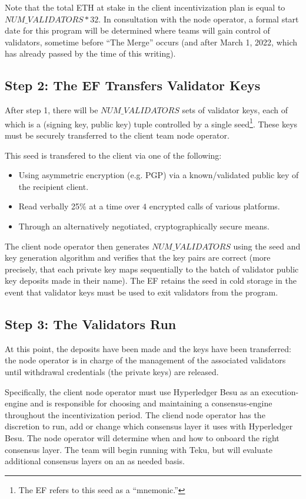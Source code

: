 Note that the total ETH at stake in the client incentivization plan is equal to $NUM\_VALIDATORS * 32$. In consultation with the node operator, a formal start date for this program will be determined where teams will gain control of validators, sometime before ``The Merge'' occurs (and after March 1, 2022, which has already passed by the time of this writing).

\subsection{Step 2:  The EF Transfers Validator Keys}
After step 1, there will be $NUM\_VALIDATORS$ sets of validator keys, each of which is a (signing key, public key) tuple controlled by a single seed\footnote{The EF refers to this seed as a ``mnemonic.''}. These keys must be securely transferred to the client team node operator.

This seed is transfered to the client via one of the following:
\begin{itemize}
\item Using asymmetric encryption (e.g. PGP) via a known/validated public key of the recipient client.
\item Read verbally 25\% at a time over $4$ encrypted calls of various platforms.
\item Through an alternatively negotiated, cryptographically secure means.
\end{itemize}

The client node operator then generates $NUM\_VALIDATORS$ using the seed and key generation algorithm and verifies that the key pairs are correct (more precisely, that each private key maps sequentially to the batch of validator public key deposits made in their name). The EF retains the seed in cold storage in the event that validator keys must be used to exit validators from the program.


\subsection{Step 3:  The Validators Run}
At this point, the deposits have been made and the keys have been transferred:  the node operator is in charge of the management of the associated validators until withdrawal credentials (the private keys) are released. 

Specifically, the client node operator must use Hyperledger Besu as an execution-engine and is responsible for choosing and maintaining a consensus-engine throughout the incentivization period.  The cliend node operator has the discretion to run, add or change which consensus layer it uses with Hyperledger Besu. The node operator will determine when and how to onboard the right consensus layer. The team will begin running with Teku, but will evaluate additional consensus layers on an as needed basis.

